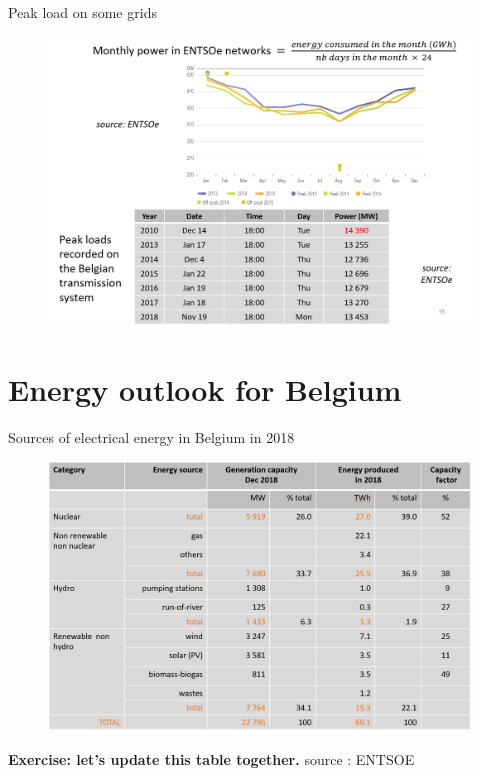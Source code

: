 \begin{frame}
{Peak load on some grids}
\begin{figure}
\centering
\includegraphics[width=0.6\linewidth]{images/peaks_BE.png}
\end{figure}
\end{frame}


\section{Energy outlook for Belgium}

\begin{frame}{Sources of electrical energy in Belgium in 2018}
\begin{figure}
\centering
\includegraphics[width=0.6\linewidth]{images/sources_BE.png}
\end{figure}

\textbf{Exercise: let's update this table together.} \footnotesize{source : ENTSOE}

\end{frame}

